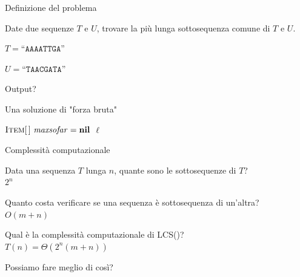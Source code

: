 \begin{frame}{Definizione del problema}

\vspace{-9pt}
\begin{myboxtitle}
Date due sequenze $T$ e $U$, trovare la più lunga sottosequenza comune di $T$ e $U$.
\end{myboxtitle}

\begin{myboxtitle}[Esempio]
\BIL
\item $T = \texttt{“AAAATTGA”}$
\item $U = \texttt{“TAACGATA”}$
\item Output?
\EIL
\end{myboxtitle}


\end{frame}

\begin{frame}[shrink=5]{Una soluzione di "forza bruta"}
  
\vspace{-9pt}
\begin{Procedure}
\caption[A]{\INTEGER\ ($\Item[\,]\ T$, $\Item[\,]\ U$)}

  $\textsc{Item}[\,]\ \mathit{maxsofar} = \textbf{nil}$\;
  \Return $\ell$\;
\end{Procedure}
  
\end{frame}


\begin{frame}{Complessità computazionale}

\vspace{-9pt}
\BIL
\item Data una sequenza $T$ lunga $n$, quante sono le sottosequenze di
$T$?\\ \pause \alert{$2^n$}
\item Quanto costa verificare se una sequenza è sottosequenza di un'altra?\\
\pause \alert{$O(m+n)$}
\item Qual è la complessità computazionale di \textsf{LCS()}?\\
\pause \alert{$T(n) = \Theta(2^n(m+n))$}
\item Possiamo fare meglio di così?
\EIL

\end{frame}

